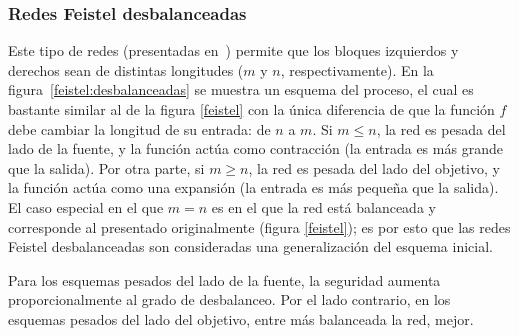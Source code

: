 %
%

\subsubsection{Redes Feistel desbalanceadas}

Este tipo de redes (presentadas en~\cite{DBLP:conf/fse/SchneierK96}) permite
que los bloques izquierdos y derechos sean de distintas longitudes ($ m $ y
$ n $, respectivamente). En la figura~\ref{feistel:desbalanceadas} se muestra
un esquema del proceso, el cual es bastante similar al de la figura
\ref{feistel} con la única diferencia de que la función $ f $ debe cambiar la
longitud de su entrada: de $ n $ a $ m $. Si $ m \le n $, la red es pesada del
lado de la fuente, y la función actúa como contracción (la entrada es más
grande que la salida). Por otra parte, si $ m \ge n $, la red es pesada del
lado del objetivo, y la función actúa como una expansión (la entrada es más
pequeña que la salida). El caso especial en el que $ m = n $ es en el que la
red está balanceada y corresponde al presentado originalmente (figura
\ref{feistel}); es por esto que las redes Feistel desbalanceadas son
consideradas una generalización del esquema inicial.

Para los esquemas pesados del lado de la fuente, la seguridad aumenta
proporcionalmente al grado de desbalanceo. Por el lado contrario, en los
esquemas pesados del lado del objetivo, entre más balanceada la red, mejor.
